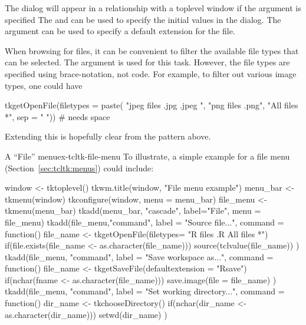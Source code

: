 The dialog will appear in a relationship with a toplevel window if the argument
 is specified The
 and
 can be used to specify the
initial values in the dialog.  The
 argument can be used to
specify a default extension for the file.

When browsing for files, it can be convenient to filter the available
file types that can be selected. The  argument is used for this task. However,
the file types are specified using \TCL\/ brace-notation, not \R\/ code. For example,
to filter out various image types, one could have 
\begin{Schunk}
\begin{Sinput}
 tkgetOpenFile(filetypes = paste(
                 "{{jpeg files} {.jpg .jpeg} }",
                 "{{png files} {.png}}",
                 "{{All files} {*}}", sep = " ")) # needs space
\end{Sinput}
\end{Schunk}
Extending this is hopefully clear from the pattern above.

\begin{example}{A ``File'' menu}{ex-tcltk-file-menu}
  To illustrate, a simple example for a file menu (Section~\ref{sec:tcltk:menus}) could include:
\begin{Schunk}
\begin{Sinput}
 window <- tktoplevel()
 tkwm.title(window, "File menu example")
 menu_bar <- tkmenu(window)
 tkconfigure(window, menu = menu_bar)
 file_menu <- tkmenu(menu_bar)
 tkadd(menu_bar, "cascade", label="File", menu = file_menu)
 tkadd(file_menu,"command", label = "Source file...",
       command =  function() {
         file_name <- tkgetOpenFile(filetypes=
                         "{{R files} {.R}} {{All files} *}")
         if(file.exists(file_name <- as.character(file_name)))
            source(tclvalue(file_name))
       })
 tkadd(file_menu, "command", label = "Save workspace as...",
       command = function() {
         file_name <- tkgetSaveFile(defaultextension = "Rsave")
         if(nchar(fname <- as.character(file_name)))
           save.image(file = file_name)
       })
 tkadd(file_menu, "command", label = "Set working directory...",
       command = function() {
         dir_name <- tkchooseDirectory()
         if(nchar(dir_name <- as.character(dir_name)))
           setwd(dir_name)
       })
\end{Sinput}
\end{Schunk}
\end{example}

